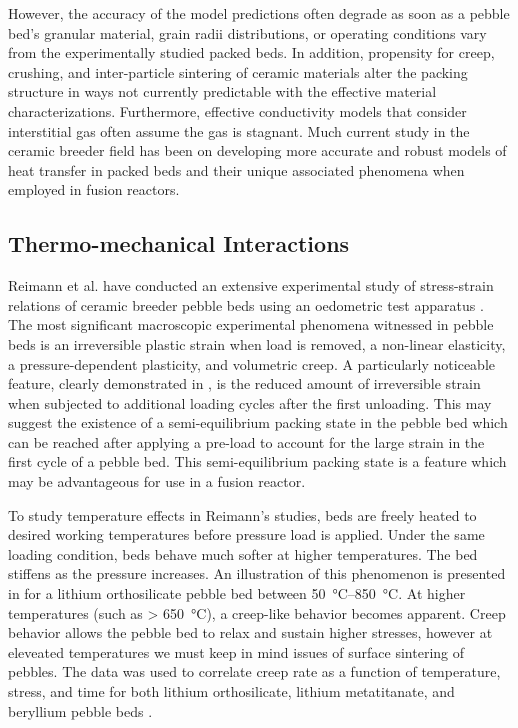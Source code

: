 \documentclass[11pt]{report} %
\begin{document}
However, the accuracy of the model predictions often degrade as soon as a pebble bed's granular material, grain radii distributions, or operating conditions vary from the experimentally studied packed beds. In addition, propensity for creep, crushing, and inter-particle sintering of ceramic materials alter the packing structure in ways not currently predictable with the effective material characterizations. Furthermore, effective conductivity models that consider interstitial gas often assume the gas is stagnant. Much current study in the ceramic breeder field has been on developing more accurate and robust models of heat transfer in packed beds and their unique associated phenomena when employed in fusion reactors.
\FloatBarrier

\subsection{Thermo-mechanical Interactions}
Reimann et al. have conducted an extensive experimental study of stress-strain relations of ceramic breeder pebble beds using an oedometric test apparatus \cite{Piazza2002811,Reimann:2002kl,Reimann:2003qc,Reimann:2002mi,Reimann:2001il}. The most significant macroscopic experimental phenomena witnessed in pebble beds is an irreversible plastic strain when load is removed, a non-linear elasticity, a pressure-dependent plasticity, and volumetric creep.  A particularly noticeable feature, clearly demonstrated in , is the reduced amount of irreversible strain when subjected to additional loading cycles after the first unloading. This may suggest the existence of a semi-equilibrium packing state in the pebble bed which can be reached after applying a pre-load to account for the large strain in the first cycle of a pebble bed. This semi-equilibrium packing state is a feature which may be advantageous for use in a fusion reactor.

To study temperature effects in Reimann's studies, beds are freely heated to desired working temperatures before pressure load is applied. Under the same loading condition, beds behave much softer at higher temperatures. The bed stiffens as the pressure increases. An illustration of this phenomenon is presented in  for a lithium orthosilicate pebble bed between \SIrange{50}{850}{\celsius}. At higher temperatures (such as > \SI{650}{\celsius}), a creep-like behavior becomes apparent. Creep behavior allows the pebble bed to relax and sustain higher stresses, however at eleveated temperatures we must keep in mind issues of surface sintering of pebbles. The data was used to correlate creep rate as a function of temperature, stress, and time for both lithium orthosilicate, lithium metatitanate, and beryllium pebble beds \cite{Buhler:2002qf,Reimann:2001il,Reimann2005}.
\end{document}
